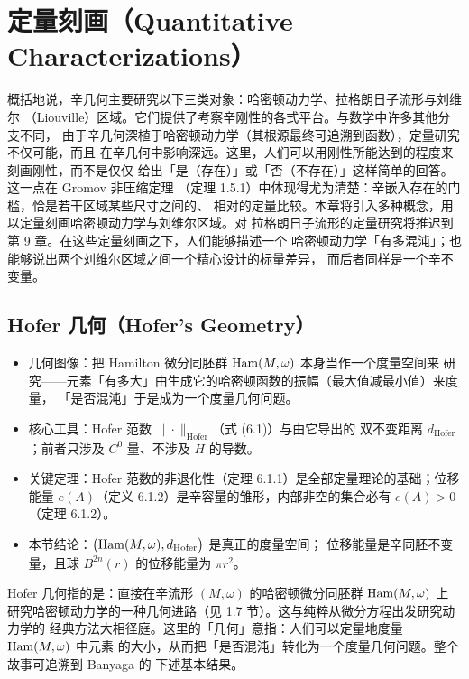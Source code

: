 \chapter{定量刻画（Quantitative Characterizations）}

概括地说，辛几何主要研究以下三类对象：哈密顿动力学、拉格朗日子流形与刘维尔
（Liouville）区域。它们提供了考察辛刚性的各式平台。与数学中许多其他分支不同，
由于辛几何深植于哈密顿动力学（其根源最终可追溯到函数），定量研究不仅可能，而且
在辛几何中影响深远。这里，人们可以用刚性所能达到的程度来刻画刚性，而不是仅仅
给出「是（存在）」或「否（不存在）」这样简单的回答。这一点在 Gromov 非压缩定理
（定理 1.5.1）中体现得尤为清楚：辛嵌入存在的门槛，恰是若干区域某些尺寸之间的、
相对的定量比较。本章将引入多种概念，用以定量刻画哈密顿动力学与刘维尔区域。对
拉格朗日子流形的定量研究将推迟到第 9 章。在这些定量刻画之下，人们能够描述一个
哈密顿动力学「有多混沌」；也能够说出两个刘维尔区域之间一个精心设计的标量差异，
而后者同样是一个辛不变量。

\section{Hofer 几何（Hofer's Geometry）}

\begin{keytakeaways}
\begin{itemize}
  \item 几何图像：把 Hamilton 微分同胚群 $\operatorname{Ham}(M,\omega)$ 本身当作一个度量空间来
        研究——元素「有多大」由生成它的哈密顿函数的振幅（最大值减最小值）来度量，
        「是否混沌」于是成为一个度量几何问题。
  \item 核心工具：Hofer 范数 $\|\cdot\|_{\mathrm{Hofer}}$（式 (6.1)）与由它导出的
        双不变距离 $d_{\mathrm{Hofer}}$；前者只涉及 $C^0$ 量、不涉及 $H$ 的导数。
  \item 关键定理：Hofer 范数的非退化性（定理 6.1.1）是全部定量理论的基础；位移
        能量 $e(A)$（定义 6.1.2）是辛容量的雏形，内部非空的集合必有 $e(A)>0$
        （定理 6.1.2）。
  \item 本节结论：$\bigl(\operatorname{Ham}(M,\omega),d_{\mathrm{Hofer}}\bigr)$ 是真正的度量空间；
        位移能量是辛同胚不变量，且球 $B^{2n}(r)$ 的位移能量为 $\pi r^2$。
\end{itemize}
\end{keytakeaways}

Hofer 几何指的是：直接在辛流形 $(M,\omega)$ 的哈密顿微分同胚群 $\operatorname{Ham}(M,\omega)$ 上
研究哈密顿动力学的一种几何进路（见 1.7 节）。这与纯粹从微分方程出发研究动力学的
经典方法大相径庭。这里的「几何」意指：人们可以定量地度量 $\operatorname{Ham}(M,\omega)$ 中元素
的大小，从而把「是否混沌」转化为一个度量几何问题。整个故事可追溯到 Banyaga 的
下述基本结果。

